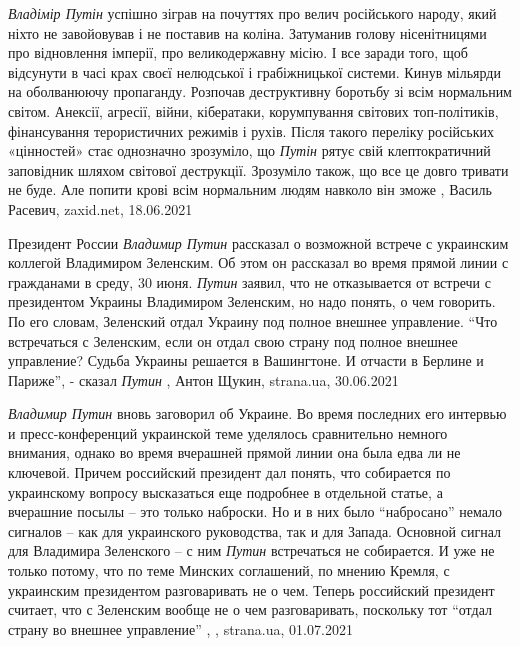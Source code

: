 \emph{Владімір Путін} успішно зіграв на почуттях про велич російського народу, який
ніхто не завойовував і не поставив на коліна. Затуманив голову нісенітницями
про відновлення імперії, про великодержавну місію. І все заради того, щоб
відсунути в часі крах своєї нелюдської і грабіжницької системи. Кинув мільярди
на оболванюючу пропаганду. Розпочав деструктивну боротьбу зі всім нормальним
світом. Анексії, агресії, війни, кібератаки, корумпування світових
топ-політиків, фінансування терористичних режимів і рухів. Після такого
переліку російських «цінностей» стає однозначно зрозуміло, що \emph{Путін} рятує свій
клептократичний заповідник шляхом світової деструкції. Зрозуміло також, що все
це довго тривати не буде. Але попити крові всім нормальним людям навколо він
зможе
, 
Василь Расевич, zaxid.net, 18.06.2021

Президент России \emph{Владимир Путин} рассказал о возможной встрече с
украинским коллегой Владимиром Зеленским. Об этом он рассказал во время прямой
линии с гражданами в среду, 30 июня. \emph{Путин} заявил, что не отказывается
от встречи с президентом Украины Владимиром Зеленским, но надо понять, о чем
говорить. По его словам, Зеленский отдал Украину под полное внешнее управление.
\enquote{Что встречаться с Зеленским, если он отдал свою страну под полное
внешнее управление? Судьба Украины решается в Вашингтоне. И отчасти в Берлине и
Париже}, - сказал \emph{Путин}
, Антон Щукин, strana.ua, 30.06.2021

\emph{Владимир Путин} вновь заговорил об Украине. Во время последних его интервью и
пресс-конференций украинской теме уделялось сравнительно немного внимания,
однако во время вчерашней прямой линии она была едва ли не ключевой. Причем
российский президент дал понять, что собирается по украинскому вопросу
высказаться еще подробнее в отдельной статье, а вчерашние посылы – это только
наброски. Но и в них было \enquote{набросано} немало сигналов – как для украинского
руководства, так и для Запада.  Основной сигнал для Владимира Зеленского – с
ним \emph{Путин} встречаться не собирается. И уже не только потому, что по теме
Минских соглашений, по мнению Кремля, с украинским президентом разговаривать не
о чем. Теперь российский президент считает, что с Зеленским вообще не о чем
разговаривать, поскольку тот \enquote{отдал страну во внешнее управление}
, 
, strana.ua, 01.07.2021

